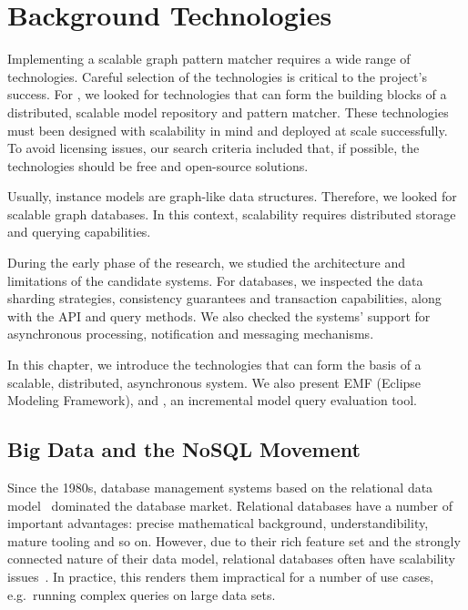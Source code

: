 \chapter{Background Technologies}
\label{chap:background-technologies}

Implementing a scalable graph pattern matcher requires a wide range of technologies. Careful selection of the technologies is critical to the project's success. For \iqd{}, we looked for technologies that can form the building blocks of a distributed, scalable model repository and pattern matcher. These technologies must been designed with scalability in mind and deployed at scale successfully. To avoid licensing issues, our search criteria included that, if possible, the technologies should be free and open-source solutions.

Usually, instance models are graph-like data structures. Therefore, we looked for scalable graph databases. In this context, scalability requires distributed storage and querying capabilities.

During the early phase of the research, we studied the architecture and limitations of the candidate systems. For databases, we inspected the data sharding strategies, consistency guarantees and transaction capabilities, along with the API and query methods. We also checked the systems' support for asynchronous processing, notification and messaging mechanisms.

In this chapter, we introduce the technologies that can form the basis of a scalable, distributed, asynchronous system. We also present EMF (Eclipse Modeling Framework), and \eiq{}, an incremental model query evaluation tool.


\section{Big Data and the NoSQL Movement}
\label{nosql}

Since the 1980s, database management systems based on the relational data model~\cite{Codd:1970:RMD:362384.362685} dominated the database market. Relational databases have a number of important advantages: precise mathematical background, understandibility, mature tooling and so on. However, due to their rich feature set and the strongly connected nature of their data model, relational databases often have scalability issues~\cite{Jacobs:2009:PBD:1536616.1536632, Sakr13}. In practice, this renders them impractical for a number of use cases, e.g.\ running complex queries on large data sets.


